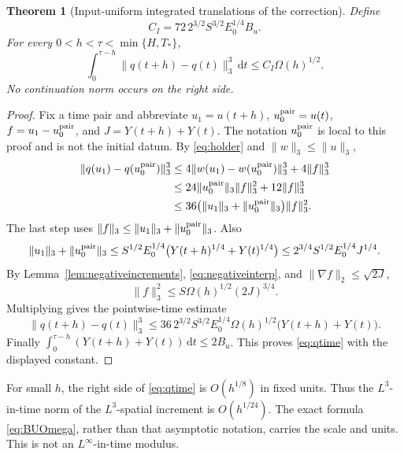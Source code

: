 \documentclass[11pt,a4paper]{article}
\newtheorem{theorem}{Theorem}[section]
\theoremstyle{definition}\newtheorem{definition}[theorem]{Definition}
\theoremstyle{remark}\newtheorem{remark}[theorem]{Remark}
\newcommand{\dd}{\,\mathrm d}
\newcommand{\norm}[1]{\lVert #1\rVert}
\numberwithin{equation}{section}
\begin{document}
\begin{theorem}[Input-uniform integrated translations of the correction]\label{thm:qtime}
Define
\begin{equation}\label{eq:CI}
 C_I=72\,2^{3/2}S^{3/2}E_0^{1/4}B_u.
\end{equation}
For every $0<h<\tau<\min\{H,T_*\}$,
\begin{equation}\label{eq:qtime}
 \int_0^{\tau-h}\norm{q(t+h)-q(t)}_3^3\dd t
 \le C_I\Omega(h)^{1/2}.
\end{equation}
No continuation norm occurs on the right side.
\end{theorem}
\begin{proof}
Fix a time pair and abbreviate $u_1=u(t+h)$, $u_0^{\rm pair}=u(t)$, $f=u_1-u_0^{\rm pair}$, and
$J=Y(t+h)+Y(t)$. The notation $u_0^{\rm pair}$ is local to this proof and is not the initial datum. By \eqref{eq:holder} and $\norm w_3\le\norm u_3$,
\begin{align*}
 \norm{q(u_1)-q(u_0^{\rm pair})}_3^3
 &\le4\norm{w(u_1)-w(u_0^{\rm pair})}_3^3+4\norm f_3^3\\
 &\le24\norm{u_0^{\rm pair}}_3\norm f_3^2+12\norm f_3^3\\
 &\le36\bigl(\norm{u_1}_3+\norm{u_0^{\rm pair}}_3\bigr)\norm f_3^2.
\end{align*}
The last step uses $\norm f_3\le\norm{u_1}_3+\norm{u_0^{\rm pair}}_3$.
Also
\[
 \norm{u_1}_3+\norm{u_0^{\rm pair}}_3
 \le S^{1/2}E_0^{1/4}\bigl(Y(t+h)^{1/4}+Y(t)^{1/4}\bigr)
 \le2^{3/4}S^{1/2}E_0^{1/4}J^{1/4}.
\]
By Lemma~\ref{lem:negativeincrements}, \eqref{eq:negativeinterp}, and
$\norm{\nabla f}_2\le\sqrt{2J}$,
\[
 \norm f_3^2\le S\Omega(h)^{1/2}(2J)^{3/4}.
\]
Multiplying gives the pointwise-time estimate
\begin{equation}\label{eq:qpairpoint}
 \norm{q(t+h)-q(t)}_3^3
 \le36\,2^{3/2}S^{3/2}E_0^{1/4}\Omega(h)^{1/2}
                  \bigl(Y(t+h)+Y(t)\bigr).
\end{equation}
Finally $\int_0^{\tau-h}(Y(t+h)+Y(t))\dd t\le2B_u$. This proves \eqref{eq:qtime} with the displayed constant.
\end{proof}

For small $h$, the right side of \eqref{eq:qtime} is $O(h^{1/8})$ in fixed units. Thus the $L^3$-in-time norm of the $L^3$-spatial increment is $O(h^{1/24})$. The exact formula \eqref{eq:BUOmega}, rather than that asymptotic notation, carries the scale and units. This is not an $L^\infty$-in-time modulus.
\end{document}
